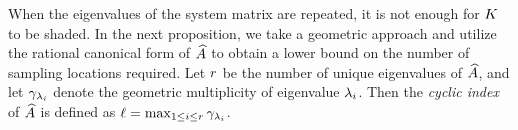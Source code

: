 When the eigenvalues of the system matrix are repeated, it is not enough for $K$ to be shaded. 
In the next proposition, we take a geometric approach and utilize the rational canonical form  of $\widehat{A}$ to obtain a lower bound on the number of sampling locations required. Let $r$ be the number of unique eigenvalues of $\widehat{A}$, and let $\gamma_{\lambda_i}$ denote the geometric multiplicity of eigenvalue $\lambda_i$. Then the \emph{cyclic index} of $\widehat{A}$ is defined as $\ell = \max_{1\leq i\leq r}{\gamma_{\lambda_i}}$\cite{wonham1974linear}.

